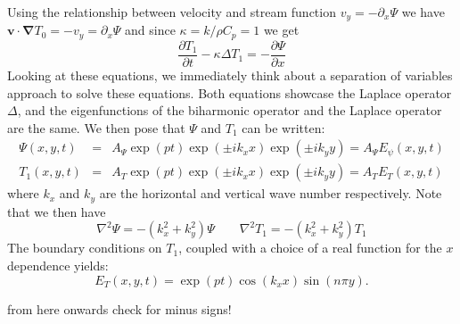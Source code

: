 Using the relationship between velocity and stream function
$v_y=-\partial_x \Psi$ we have ${\bm v}\cdot {\bm \nabla} T_0 = -v_y = \partial_x \Psi$ and since $\kappa =k/\rho C_p=1$ we get 
\begin{equation}
\boxed{
\frac{\partial T_1}{\partial t} - \kappa \Delta T_1 = -\frac{\partial \Psi}{\partial x}
}
\end{equation}
Looking at these equations, we immediately think about a separation of variables approach to solve these
equations. Both equations showcase the Laplace operator $\Delta$, and the eigenfunctions of the biharmonic operator and the Laplace operator are the same. 
We then pose that $\Psi$ and $T_1$ can be written:
\begin{eqnarray}
\Psi(x,y,t) &=& A_\Psi \exp(pt)\exp(\pm i k_x x) \exp(\pm i k_y y)= A_\Psi E_\psi(x,y,t) \\
T_1(x,y,t) &=& A_T \exp(pt) \exp(\pm i k_x x) \exp(\pm i k_y y)=A_T E_T(x,y,t) 
\end{eqnarray}
where $k_x$ and $k_y$ are the horizontal and vertical wave number respectively.
Note that we then have
\[
\nabla^2 \Psi = -(k_x^2+k_y^2) \Psi
\quad\quad
\nabla^2 T_1 = -(k_x^2+k_y^2) T_1
\]
The boundary conditions on $T_1$, coupled with a choice of a real function for the $x$ dependence yields:
\[
E_T(x,y,t) = \exp(pt) \cos (k_x x) \sin (n\pi y).
\]

{\color{red} from here onwards check for minus signs!}

